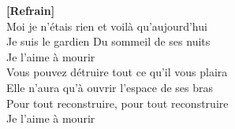 \documentclass{novel}
\begin{document}
{\begin{minipage}[t][0.65\textheight][t]{\textwidth}
\begin{multicols}{2}
\small
\textbf{[Refrain]}\\

Moi je n'étais rien et voilà qu'aujourd'hui \\
Je suis le gardien Du sommeil de ses nuits \\
Je l'aime à mourir \\
Vous pouvez détruire tout ce qu'il vous plaira \\
Elle n'aura qu'à ouvrir l'espace de ses bras \\
Pour tout reconstruire, pour tout reconstruire \\
Je l'aime à mourir \\

\end{multicols}
\end{minipage}
}
\end{document}
